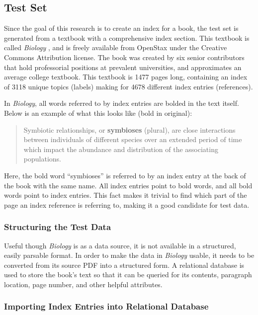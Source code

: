 \subsection{Test Set}
\label{subsec:test-set}

Since the goal of this research is to create an index for a book, the test set is generated from a textbook with a comprehensive index section.
This textbook is called {\it Biology} \cite{biology}, and is freely available from OpenStax \cite{openstax-bio} under the Creative Commons Attribution license.
The book was created by six senior contributors that hold professorial positions at prevalent universities, and approximates an average college textbook.
This textbook is 1477 pages long, containing an index of 3118 unique topics (labels) making for 4678 different index entries (references).

In {\it Biology}, all words referred to by index entries are bolded in the text itself. Below is an example of what this looks like (bold in original):

\begin{quote}
Symbiotic relationships, or {\bf symbioses} (plural), are close interactions between individuals of different species over an extended period of time which impact the abundance and distribution of the associating populations. \cite{biology}
\end{quote}

\noindent Here, the bold word ``symbioses'' is referred to by an index entry at the back of the book with the same name. All index entries point to bold words, and all bold words point to index entries. This fact makes it trivial to find which part of the page an index reference is referring to, making it a good candidate for test data.

\subsubsection{Structuring the Test Data}

Useful though {\it Biology} is as a data source, it is not available in a structured, easily parsable format.
In order to make the data in {\it Biology} usable, it needs to be converted from its source PDF into a structured form.
A relational database is used to store the book's text so that it can be queried for its contents, paragraph location, page number, and other helpful attributes.

\subsubsection{Importing Index Entries into Relational Database}

